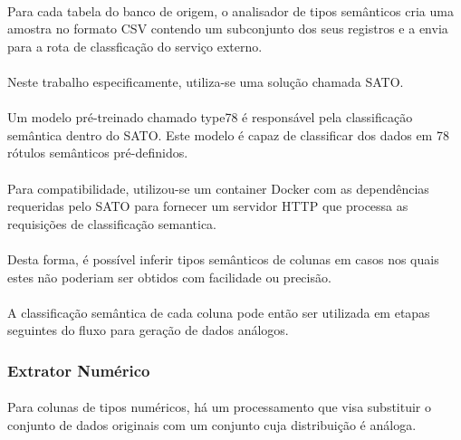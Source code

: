 \paragraph{} Para cada tabela do banco de origem, o analisador de tipos semânticos cria uma amostra no formato CSV contendo um subconjunto dos seus registros e a envia para a rota de classficação do serviço externo.

\paragraph{} Neste trabalho especificamente, utiliza-se uma solução chamada SATO\cite{zhang2019sato}.

\paragraph{} Um modelo pré-treinado chamado type78 é responsável pela classificação semântica dentro do SATO. Este modelo é capaz de classificar dos dados em 78 rótulos semânticos pré-definidos.

\paragraph{} Para compatibilidade, utilizou-se um container Docker com as dependências requeridas pelo SATO para fornecer um servidor HTTP que processa as requisições de classificação semantica.

\paragraph{} Desta forma, é possível inferir tipos semânticos de colunas em casos nos quais estes não poderiam ser obtidos com facilidade ou precisão.

\paragraph{} A classificação semântica de cada coluna pode então ser utilizada em etapas seguintes do fluxo para geração de dados análogos.

\subsubsection{Extrator Numérico}

\paragraph{} Para colunas de tipos numéricos, há um processamento que visa substituir o conjunto de dados originais com um conjunto cuja distribuição é análoga.

